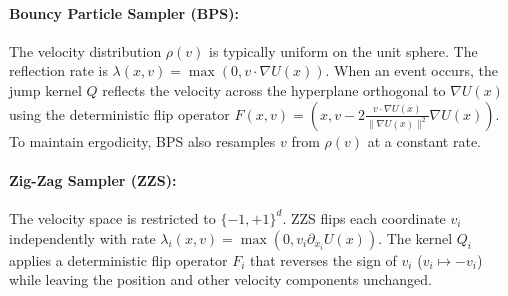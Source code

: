 \documentclass{article}
\begin{document}
\paragraph{Bouncy Particle Sampler (BPS):} The velocity distribution $\rho(v)$ is typically uniform on the unit sphere. The reflection rate is $\lambda(x,v) = \max(0, v \cdot \nabla U(x))$. When an event occurs, the jump kernel $Q$ reflects the velocity across the hyperplane orthogonal to $\nabla U(x)$ using the deterministic flip operator $F(x, v) = \left(x, v - 2\frac{v \cdot \nabla U(x)}{\|\nabla U(x)\|^2}\nabla U(x)\right)$. To maintain ergodicity, BPS also resamples $v$ from $\rho(v)$ at a constant rate.
    
\paragraph{Zig-Zag Sampler (ZZS):} The velocity space is restricted to $\{-1, +1\}^d$. ZZS flips each coordinate $v_i$ independently with rate $\lambda_i(x, v) = \max(0, v_i \partial_{x_i} U(x))$. The kernel $Q_i$ applies a deterministic flip operator $F_i$ that reverses the sign of $v_i$ ($v_i \mapsto -v_i$) while leaving the position and other velocity components unchanged.
\end{document}
